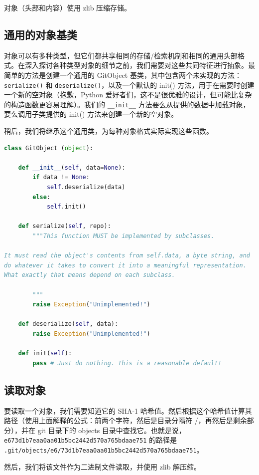 \documentclass{ctexart}
\theoremstyle{remark}
\theoremstyle{warningstyle}
\theoremstyle{warningstyle}
\begin{document}
对象（头部和内容）使用 zlib 压缩存储。

\subsection{通用的对象基类}
对象可以有多种类型，但它们都共享相同的存储/检索机制和相同的通用头部格式。在深入探讨各种类型对象的细节之前，我们需要对这些共同特征进行抽象。最简单的方法是创建一个通用的 GitObject 基类，其中包含两个未实现的方法：\lstinline|serialize()| 和 \lstinline|deserialize()|，以及一个默认的 init() 方法，用于在需要时创建一个新的空对象（抱歉，Python 爱好者们，这不是很优雅的设计，但可能比复杂的构造函数更容易理解）。我们的 \lstinline|__init__| 方法要么从提供的数据中加载对象，要么调用子类提供的 init() 方法来创建一个新的空对象。

稍后，我们将继承这个通用类，为每种对象格式实际实现这些函数。
\begin{lstlisting}[language=Python]
class GitObject (object):

    def __init__(self, data=None):
        if data != None:
            self.deserialize(data)
        else:
            self.init()

    def serialize(self, repo):
        """This function MUST be implemented by subclasses.

It must read the object's contents from self.data, a byte string, and
do whatever it takes to convert it into a meaningful representation.
What exactly that means depend on each subclass.

        """
        raise Exception("Unimplemented!")

    def deserialize(self, data):
        raise Exception("Unimplemented!")

    def init(self):
        pass # Just do nothing. This is a reasonable default!
\end{lstlisting}

\subsection{读取对象}
要读取一个对象，我们需要知道它的 SHA-1 哈希值。然后根据这个哈希值计算其路径（使用上面解释的公式：前两个字符，然后是目录分隔符 /，再然后是剩余部分），并在 git 目录下的 objects 目录中查找它。也就是说，\lstinline|e673d1b7eaa0aa01b5bc2442d570a765bdaae751| 的路径是 \lstinline|.git/objects/e6/73d1b7eaa0aa01b5bc2442d570a765bdaae751|。

然后，我们将该文件作为二进制文件读取，并使用 zlib 解压缩。
\end{document}

